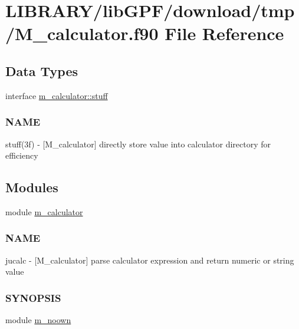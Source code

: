 \hypertarget{M__calculator_8f90}{}\section{L\+I\+B\+R\+A\+R\+Y/lib\+G\+P\+F/download/tmp/\+M\+\_\+calculator.f90 File Reference}
\label{M__calculator_8f90}
\subsection*{Data Types}
\begin{DoxyCompactItemize}
\item 
interface \hyperlink{interfacem__calculator_1_1stuff}{m\+\_\+calculator\+::stuff}
\begin{DoxyCompactList}\small\item\em \subsubsection*{N\+A\+ME}

stuff(3f) -\/ \mbox{[}M\+\_\+calculator\mbox{]} directly store value into calculator directory for efficiency \end{DoxyCompactList}\end{DoxyCompactItemize}
\subsection*{Modules}
\begin{DoxyCompactItemize}
\item 
module \hyperlink{namespacem__calculator}{m\+\_\+calculator}
\begin{DoxyCompactList}\small\item\em \subsubsection*{N\+A\+ME}

jucalc -\/ \mbox{[}M\+\_\+calculator\mbox{]} parse calculator expression and return numeric or string value \subsubsection*{S\+Y\+N\+O\+P\+S\+IS}\end{DoxyCompactList}\item 
module \hyperlink{namespacem__noown}{m\+\_\+noown}
\end{DoxyCompactItemize}
